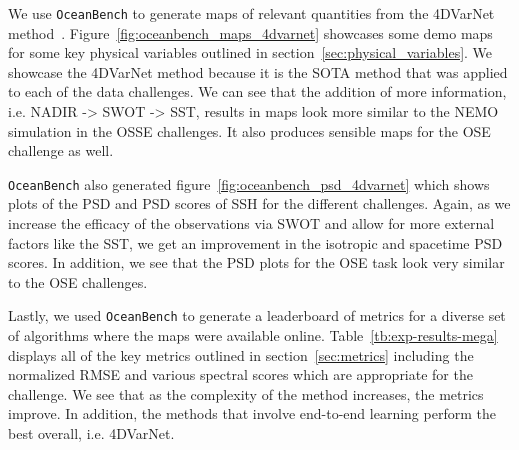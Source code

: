 We use \texttt{OceanBench} to generate maps of relevant quantities from the 4DVarNet method~\cite{4DVARNETSWOT,4DVARNETSST}.
Figure~\ref{fig:oceanbench_maps_4dvarnet} showcases some demo maps for some key physical variables outlined in section~\ref{sec:physical_variables}.
We showcase the 4DVarNet method because it is the SOTA method that was applied to each of the data challenges.
We can see that the addition of more information, i.e. NADIR -> SWOT -> SST, results in maps look more similar to the NEMO simulation in the OSSE challenges.
It also produces sensible maps for the OSE challenge as well.

\texttt{OceanBench} also generated figure~\ref{fig:oceanbench_psd_4dvarnet} which shows plots of the PSD and PSD scores of SSH for the different challenges.
Again, as we increase the efficacy of the observations via SWOT and allow for more external factors like the SST, we get an improvement in the isotropic and spacetime PSD scores.
In addition, we see that the PSD plots for the OSE task look very similar to the OSE challenges. 

Lastly, we used \texttt{OceanBench} to generate a leaderboard of metrics for a diverse set of algorithms where the maps were available online.
Table~\ref{tb:exp-results-mega} displays all of the key metrics outlined in section~\ref{sec:metrics} including the normalized RMSE and various spectral scores which are appropriate for the challenge.
We see that as the complexity of the method increases, the metrics improve. 
In addition, the methods that involve end-to-end learning perform the best overall, i.e. 4DVarNet.

